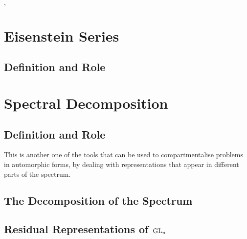 \cite{lapidPerspectivesEisensteinSeries2022}, \cite{arthurEisensteinSeriesTrace1979}
\section{Eisenstein Series}
\subsection{Definition and Role}\label{intertwining_operator}


\section{Spectral Decomposition}\label{spectral_decomposition}
\subsection{Definition and Role}
This is another one of the tools that can be used to compartmentalise problems in automorphic forms, by dealing with representations that appear in different parts of the spectrum. 

\subsection{The Decomposition of the Spectrum}

\subsection{Residual Representations of \(\operatorname{GL}_n\)}